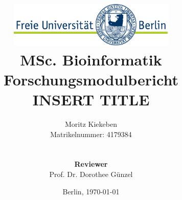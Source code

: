 \documentclass[12pt,a4paper,english]{article}
\title{\includegraphics[width=0.6\textwidth]{pictures/logo}\\
{\normalsize MSc. Bioinformatik Forschungsmodulbericht}\\[6ex]
INSERT TITLE}
\author{Moritz Kiekeben\\
{\normalsize Matrikelnummer: 4179384}\\
{\normalsize \mailto{moritz.k@fu-berlin.de}}\\\\
{\normalsize \textbf{Reviewer}}\\
{\normalsize Prof. Dr. Dorothee Günzel}}
\date{Berlin, \today}
\begin{document}
\begin{titlepage}

\maketitle
\thispagestyle{empty}



\end{titlepage}
\vfill{}
\begin{abstract}
\blindtext
\end{abstract}
\vfill{}
\pagestyle{empty}
\clearpage{}



\tableofcontents

\clearpage
{}
\pagestyle{fancy}
\setcounter{page}{1}

      
            
     

\newpage


\end{document}
